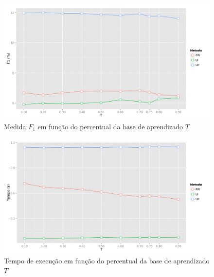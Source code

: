 {\begin{figure}[hp]
    \begin{center}
    \includegraphics[width=1\textwidth]{img/F1_T}
    \end{center}
    \caption{Medida $F_1$ em função do percentual da base de aprendizado $T$}
    \label{fig:F1_T}
\end{figure}

\begin{figure}[hp]
    \begin{center}
    \includegraphics[width=1\textwidth]{img/time_T}
    \end{center}
    \caption{Tempo de execução em função do percentual da base de aprendizado $T$}
    \label{fig:time_T}
\end{figure}

}
